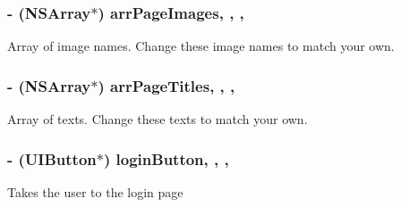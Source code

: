 \subsubsection[{arr\+Page\+Images}]{\setlength{\rightskip}{0pt plus 5cm}-\/ (N\+S\+Array$\ast$) arr\+Page\+Images\hspace{0.3cm}{\ttfamily [read]}, {\ttfamily [write]}, {\ttfamily [nonatomic]}, {\ttfamily [strong]}}\label{interface_e_s_welcome_view_controller_ab1fa9eaf196768d10dbaf4e101e9308d}
Array of image names. Change these image names to match your own. \hypertarget{interface_e_s_welcome_view_controller_afc99f304c8e5e4e45b0e38df7530a05f}{}
\subsubsection[{arr\+Page\+Titles}]{\setlength{\rightskip}{0pt plus 5cm}-\/ (N\+S\+Array$\ast$) arr\+Page\+Titles\hspace{0.3cm}{\ttfamily [read]}, {\ttfamily [write]}, {\ttfamily [nonatomic]}, {\ttfamily [strong]}}\label{interface_e_s_welcome_view_controller_afc99f304c8e5e4e45b0e38df7530a05f}
Array of texts. Change these texts to match your own. \hypertarget{interface_e_s_welcome_view_controller_ac798c8dfa635202eee4ce873752c0eac}{}
\subsubsection[{login\+Button}]{\setlength{\rightskip}{0pt plus 5cm}-\/ (U\+I\+Button$\ast$) login\+Button\hspace{0.3cm}{\ttfamily [read]}, {\ttfamily [write]}, {\ttfamily [nonatomic]}, {\ttfamily [strong]}}\label{interface_e_s_welcome_view_controller_ac798c8dfa635202eee4ce873752c0eac}
Takes the user to the login page \hypertarget{interface_e_s_welcome_view_controller_ae9b2c8b929156c91622ad2ebd384a05e}{}
